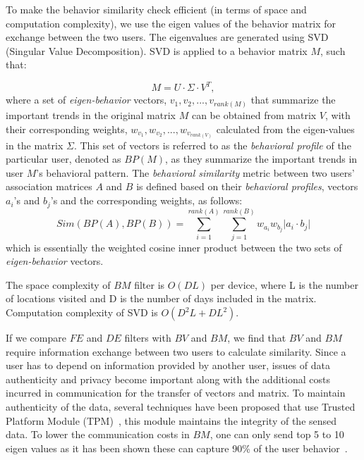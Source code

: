 \documentclass[10pt,conference]{IEEEtran}
\begin{document}
To make the behavior similarity check  efficient (in terms of space and computation complexity), we use the eigen values of the behavior matrix for exchange between the two users. The eigenvalues are generated using SVD (Singular Value Decomposition). SVD is applied to a behavior matrix $M$, such that:

\begin{equation} \label{svd-eq}
M = U \cdot \Sigma \cdot V^T,
\end{equation}
where a set of {\it eigen-behavior} vectors,  $v_1, v_2, ..., v_{rank(M)}$ that summarize the important trends in the original matrix $M$ can be obtained from matrix $V$, with their corresponding weights, $w_{v_1}, w_{v_2}, ..., w_{v_{rank(V)}}$ calculated from the eigen-values in the matrix $\Sigma$.  This set of vectors is referred to as the {\it behavioral profile} of the particular user, denoted as $BP(M)$, as they summarize the important trends in user $M$'s behavioral pattern. The {\it behavioral similarity} metric between two users' association matrices $A$ and $B$ is defined based on their {\it behavioral profiles}, vectors $a_i$'s and $b_j$'s and the corresponding weights, as follows: 
\begin{equation} \label{sim-index}
Sim(BP(A),BP(B)) = \sum^{rank(A)}_{i=1} \sum^{rank(B)}_{j=1}
w_{a_i}w_{b_j}\vert a_i \cdot b_j \vert
\end{equation}
which is essentially the weighted cosine inner product between the two sets of {\it eigen-behavior} vectors.


The space complexity of $BM$ filter is $O(DL)$ per device, where L is the number of locations visited and D is the number of days included in the matrix.  Computation complexity of SVD is $O(D^2L+DL^2)$.





If we compare $FE$ and $DE$ filters with $BV$ and $BM$, we find that $BV$ and $BM$ require information exchange between two users to calculate similarity. Since a user has to depend on information provided by another user, issues of data authenticity and privacy become important along with the additional costs incurred in communication for the transfer of vectors and matrix. To maintain authenticity of the data, several techniques have been proposed that use  Trusted Platform Module (TPM)~\cite{trustedcomputing,towardstrusted}, this module maintains the integrity of the sensed data. To lower the communication costs in $BM$, one can only send top 5 to 10 eigen values as it has been shown these can capture 90\% of the user behavior~\cite{profilecast}.  
\end{document}
